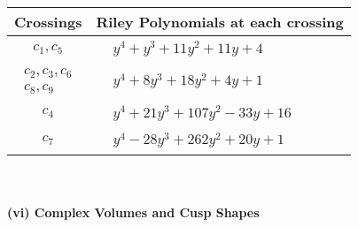 \documentclass[1p]{elsarticle_modified}
\theoremstyle{definition}
\begin{document}
\begin{tabular}{m{50pt}|m{274pt}}
Crossings & \hspace{64pt}Riley Polynomials at each crossing \\
\hline $$\begin{aligned}c_{1},c_{5}\end{aligned}$$&$\begin{aligned}
&y^4+y^3+11 y^2+11 y+4
\end{aligned}$\\
\hline $$\begin{aligned}c_{2},c_{3},c_{6}\\c_{8},c_{9}\end{aligned}$$&$\begin{aligned}
&y^4+8 y^3+18 y^2+4 y+1
\end{aligned}$\\
\hline $$\begin{aligned}c_{4}\end{aligned}$$&$\begin{aligned}
&y^4+21 y^3+107 y^2-33 y+16
\end{aligned}$\\
\hline $$\begin{aligned}c_{7}\end{aligned}$$&$\begin{aligned}
&y^4-28 y^3+262 y^2+20 y+1
\end{aligned}$\\
\hline
\end{tabular}\\~\\
\newpage\flushleft \textbf{(vi) Complex Volumes and Cusp Shapes}
\end{document}
